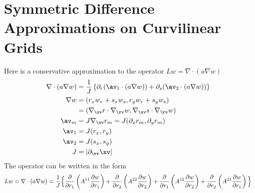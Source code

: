 \documentclass[10pt]{article}
\newcommand{\grad}{\nabla}
\begin{document}
\section{Symmetric Difference Approximations on Curvilinear Grids}
Here is a conservative approximation to the operator $L w = \grad\cdot( a  \grad w)$
\begin{align*}
   \grad\cdot( a  \grad w) & =
        {1\over J}\left\{ \partial_r( \av_1\cdot(a\grad w)) + \partial_s( \av_2\cdot(a\grad w)) \right\} \\
   \grad w &= ( r_x w_r + s_x w_s, r_y w_r + s_y w_s )\\
           &= (\grad_\xv r \cdot \grad_\rv w, \grad_\xv s \cdot \grad_\rv w) \\
   \av_m  & = J \grad_\xv r_m  = J( \partial_x r_m ,\partial_y r_m )  \\
   \av_1  & = J( r_x,r_y)  \\
   \av_2  & = J( s_x,s_y)  \\
    J &= | \partial_\rv \xv |
\end{align*}
The operator can be written in the form
\[
 Lw = 
\grad\cdot( a \grad w) = {1\over J} \Big\lbrace  
        {\partial\over\partial r_1}\left( A^{11} {\partial w \over\partial r_1} \right) +
        {\partial\over\partial r_2}\left( A^{22} {\partial w \over\partial r_2} \right) + 
        {\partial\over\partial r_1}\left( A^{12} {\partial w \over\partial r_2} \right) + 
        {\partial\over\partial r_2}\left( A^{21} {\partial w \over\partial r_1} \right) \Big\rbrace 
\]
\end{document}
